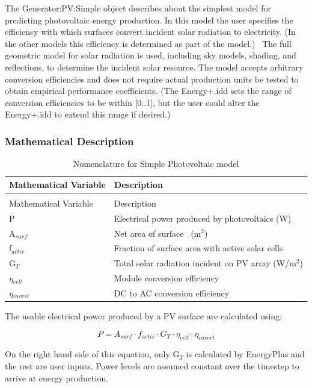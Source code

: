 The Generator:PV:Simple object describes about the simplest model for predicting photovoltaic energy production. In this model the user specifies the efficiency with which surfaces convert incident solar radiation to electricity. (In the other models this efficiency is determined as part of the model.)~ The full geometric model for solar radiation is used, including sky models, shading, and reflections, to determine the incident solar resource. The model accepts arbitrary conversion efficiencies and does not require actual production units be tested to obtain empirical performance coefficients. (The Energy+.idd sets the range of conversion efficiencies to be within {[}0..1{]}, but the user could alter the Energy+.idd to extend this range if desired.)

\subsubsection{Mathematical Description}\label{mathematical-description}

\begin{longtable}[l]{p{1.2in}p{4.8in}}
\caption{Nomenclature for Simple Photovoltaic model \label{table:nomenclature-for-simple-photovoltaic-model}} \tabularnewline
\toprule
Mathematical Variable & Description \tabularnewline
\midrule
\endfirsthead

\caption[]{Nomenclature for Simple Photovoltaic model} \tabularnewline
\toprule
Mathematical Variable & Description \tabularnewline
\midrule
\endhead

P & Electrical power produced by photovoltaics (W) \tabularnewline
A\(_{surf}\) & Net area of surface~ (m\(^{2}\)) \tabularnewline
f\(_{activ}\) & Fraction of surface area with active solar cells \tabularnewline
G\(_{T}\) & Total solar radiation incident on PV array (W/m\(^{2}\)) \tabularnewline
$\eta$\(_{cell}\) & Module conversion efficiency \tabularnewline
$\eta$\(_{invert}\) & DC to AC conversion efficiency \tabularnewline
\bottomrule
\end{longtable}

The usable electrical power produced by a PV surface are calculated using:

\begin{equation}
P = {A_{surf}} \cdot {f_{activ}} \cdot {G_T} \cdot {\eta_{cell}} \cdot {\eta_{invert}}
\end{equation}

On the right hand side of this equation, only G\(_{T}\) is calculated by EnergyPlus and the rest are user inputs. Power levels are assumed constant over the timestep to arrive at energy production.

